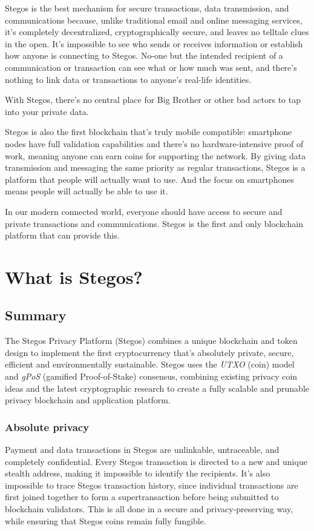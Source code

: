 \documentclass[8pt,fleqn,openany]{book}
\begin{document}
Stegos is the best mechanism for secure transactions, data transmission, and communications because, unlike traditional email and online messaging services, it’s completely decentralized, cryptographically secure, and leaves no telltale clues in the open. It’s impossible to see who sends or receives information or establish how anyone is connecting to Stegos. No-one but the intended recipient of a communication or transaction can see what or how much was sent, and there’s nothing to link data or transactions to anyone’s real-life identities.

With Stegos, there's no central place for Big Brother or other bad actors to tap into your private data.

Stegos is also the first blockchain that's truly mobile compatible: smartphone nodes have full validation capabilities and there's no hardware-intensive proof of work, meaning anyone can earn coins for supporting the network. By giving data transmission and messaging the same priority as regular transactions, Stegos is a platform that people will actually want to use. And the focus on smartphones means people will actually be able to use it.

In our modern connected world, everyone should have access to secure and private transactions and communications. Stegos is the first and only blockchain platform that can provide this.  
	
\chapter{What is Stegos?}\label{chap:what-is-stegos}

\section{Summary}
The Stegos Privacy Platform (Stegos) combines a unique blockchain and token design to implement the first cryptocurrency that’s absolutely private, secure, efficient and environmentally sustainable. Stegos uses the \textit{UTXO} (coin) model and \textit{gPoS} (gamified Proof-of-Stake) consensus, combining existing privacy coin ideas and the latest cryptographic research to create a fully scalable and prunable privacy blockchain and application platform. 
 
\subsection{Absolute privacy}
Payment and data transactions in Stegos are unlinkable, untraceable, and completely confidential. Every Stegos transaction is directed to a new and unique stealth address, making it impossible to identify the recipients. It’s also impossible to trace Stegos transaction history, since individual transactions are first joined together to form a supertransaction before being submitted to blockchain validators. This is all done in a secure and privacy-preserving way, while ensuring that Stegos coins remain fully fungible.
\end{document}
